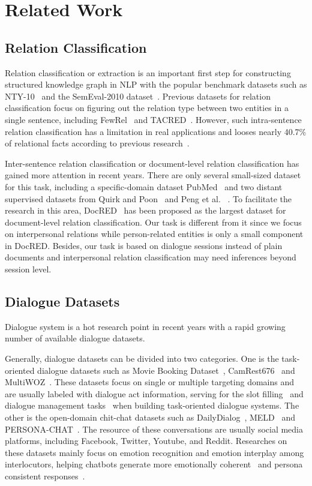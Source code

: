 \section{Related Work}

\subsection{Relation Classification}
Relation classification or extraction is an important first step for constructing structured knowledge graph in NLP with the popular benchmark datasets such as NTY-10~\cite{RiedelYM10} and the SemEval-2010 dataset~\cite{HendrickxKKNSPP10}. Previous datasets for relation classification focus on figuring out the relation type between two entities in a single sentence, including FewRel~\cite{HanZYWYLS18} and  TACRED~\cite{ZhangZCAM17}.  However, such intra-sentence relation classification has a limitation in real applications and looses nearly 40.7\% of relational facts according to previous research~\cite{SwampillaiS10,VergaSM18,YaoYLHLLLHZS19}.

Inter-sentence relation classification or document-level relation classification has gained more attention in recent years. There are only several small-sized dataset for this task, including a specific-domain dataset PubMed~\cite{LiSJSWLDMWL16} and two distant supervised datasets from Quirk and Poon~ and Peng et al. ~. To facilitate the research in this area, DocRED~\cite{YaoYLHLLLHZS19} has been proposed as the largest dataset for document-level relation classification. Our task is different from it since we focus on interpersonal relations while person-related entities is only a small component in DocRED. Besides, our task is based on dialogue sessions instead of plain documents and interpersonal relation classification may need inferences beyond session level.

\subsection{Dialogue Datasets}
Dialogue system is a hot research point in recent years with a rapid growing number of available dialogue datasets. 

Generally, dialogue datasets can be divided into two categories. 
One is the task-oriented dialogue datasets such as Movie Booking Dataset~\cite{LiCLGC17}, CamRest676~\cite{UltesRSVKCBMWGY17} and MultiWOZ~\cite{BudzianowskiWTC18}. These datasets focus on single or multiple targeting domains and are usually labeled with dialogue act information, serving for the slot filling~\cite{LiuWXF20} and dialogue management tasks~\cite{BudzianowskiV19} when building task-oriented dialogue systems.
The other is the open-domain chit-chat datasets such as DailyDialog~\cite{LiSSLCN17}, MELD~\cite{PoriaHMNCM19} and PERSONA-CHAT~\cite{KielaWZDUS18}. The resource of these conversations are usually social media platforms, including Facebook, Twitter, Youtube, and Reddit. Researches on these datasets mainly focus on emotion recognition and emotion interplay among interlocutors, helping chatbots generate more emotionally coherent~\cite{GhosalMPCG19} and persona consistent responses~\cite{ZhengZHM20}.

